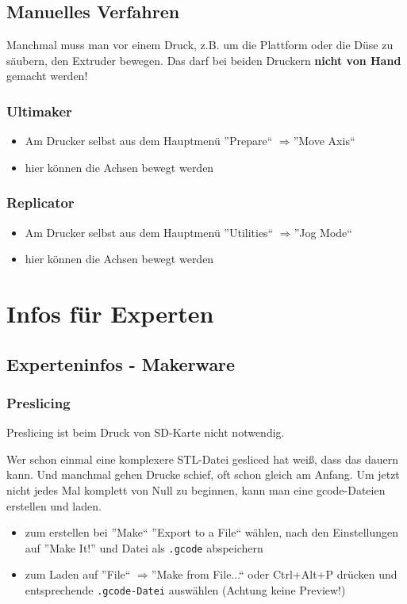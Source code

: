\documentclass{\basedir/fablab-document}
\newcommand{\ra}{$\Rightarrow$}
\begin{document}
\subsection{Manuelles Verfahren}\label{manuelles-verfahren}
Manchmal muss man vor einem Druck, z.B. um die Plattform oder die Düse zu säubern, den Extruder bewegen.
Das darf bei beiden Druckern \textbf{nicht von Hand} gemacht werden!

\subsubsection{Ultimaker}
\begin{itemize}
	\item Am Drucker selbst aus dem Hauptmenü ''Prepare`` \ra ''Move Axis``
	\item hier können die Achsen bewegt werden
\end{itemize}

\subsubsection{Replicator}
\begin{itemize}
 \item Am Drucker selbst aus dem Hauptmenü ''Utilities`` \ra ''Jog Mode``
 \item hier können die Achsen bewegt werden
\end{itemize}

\section{Infos für Experten}

\subsection{Experteninfos - Makerware} \label{expinfos}
\subsubsection{Preslicing}
Preslicing ist beim Druck von SD-Karte nicht notwendig.

Wer schon einmal eine komplexere STL-Datei gesliced hat weiß, dass das dauern kann. Und manchmal gehen Drucke schief,
oft schon gleich am Anfang. Um jetzt nicht jedes Mal komplett von Null zu beginnen, kann man eine gcode-Dateien erstellen
und laden.
\begin{itemize}
\item zum erstellen bei ''Make`` ''Export to a File`` wählen, nach den Einstellungen auf ''Make It!'' und Datei als \texttt{.gcode} abspeichern
\item zum Laden auf ''File`` \ra ''Make from File...`` oder Ctrl+Alt+P drücken und entsprechende \texttt{.gcode-Datei} auswählen (Achtung keine Preview!)
\end{itemize}
\end{document}
